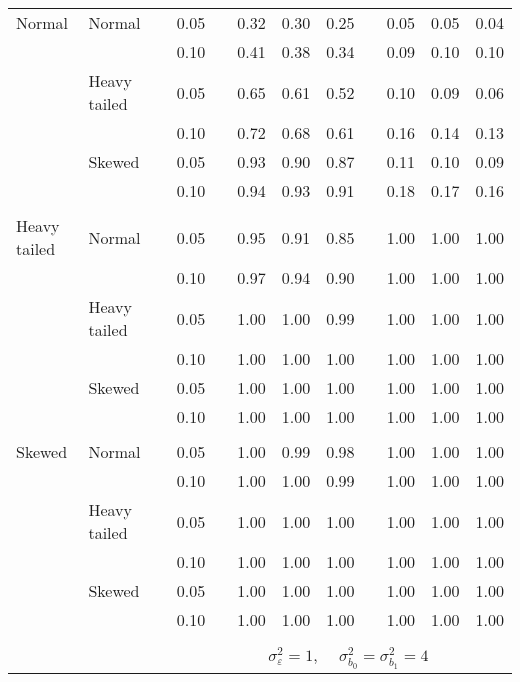 \begin{table}[ht]
\begin{scriptsize}
\begin{tabular}{ll p{.1cm} c p{.1cm} rrr p{.1cm} rrr}
\rowcolor{gray!20} Normal       & Normal       && 0.05 &&   0.32 & 0.30 & 0.25 && 0.05 & 0.05 & 0.04 \\ 
\rowcolor{gray!20}             &              && 0.10 &&   0.41 & 0.38 & 0.34 && 0.09 & 0.10 & 0.10 \\ 
\rowcolor{gray!20}             & Heavy tailed && 0.05 &&   0.65 & 0.61 & 0.52 && 0.10 & 0.09 & 0.06 \\ 
\rowcolor{gray!20}             &              && 0.10 &&   0.72 & 0.68 & 0.61 && 0.16 & 0.14 & 0.13 \\ 
\rowcolor{gray!20}             & Skewed       && 0.05 &&   0.93 & 0.90 & 0.87 && 0.11 & 0.10 & 0.09 \\ 
\rowcolor{gray!20}             &              && 0.10 &&   0.94 & 0.93 & 0.91 && 0.18 & 0.17 & 0.16 \\ 
             &&&&&&&&&&&\\
Heavy tailed & Normal       && 0.05 &&   0.95 & 0.91 & 0.85 && 1.00 & 1.00 & 1.00 \\ 
             &              && 0.10 &&   0.97 & 0.94 & 0.90 && 1.00 & 1.00 & 1.00 \\ 
             & Heavy tailed && 0.05 &&   1.00 & 1.00 & 0.99 && 1.00 & 1.00 & 1.00 \\ 
             &              && 0.10 &&   1.00 & 1.00 & 1.00 && 1.00 & 1.00 & 1.00 \\ 
             & Skewed       && 0.05 &&   1.00 & 1.00 & 1.00 && 1.00 & 1.00 & 1.00 \\ 
             &              && 0.10 &&   1.00 & 1.00 & 1.00 && 1.00 & 1.00 & 1.00 \\
             &&&&&&&&&&&\\ 
Skewed       & Normal       && 0.05 &&   1.00 & 0.99 & 0.98 && 1.00 & 1.00 & 1.00 \\ 
             &              && 0.10 &&   1.00 & 1.00 & 0.99 && 1.00 & 1.00 & 1.00 \\ 
             & Heavy tailed && 0.05 &&   1.00 & 1.00 & 1.00 && 1.00 & 1.00 & 1.00 \\ 
             &              && 0.10 &&   1.00 & 1.00 & 1.00 && 1.00 & 1.00 & 1.00 \\ 
             & Skewed       && 0.05 &&   1.00 & 1.00 & 1.00 && 1.00 & 1.00 & 1.00 \\ 
             &              && 0.10 &&   1.00 & 1.00 & 1.00 && 1.00 & 1.00 & 1.00 \\ 


&&&&&&&&&&&\\
& && && \multicolumn{6}{c}{$\sigma_{\varepsilon}^2 = 1$, \ \ $\sigma_{b_0}^2 = \sigma_{b_1}^2 = 4$} \\ \cline{6-12}


\end{tabular}
\end{scriptsize}
\end{table}
